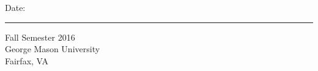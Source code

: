         Date: \rule{\datelinelength}{\siglinedepth} \hspace{\spacesiglinename} \!\!Fall Semester 2016 \\
        George Mason University \\
        Fairfax, VA
\newpage


